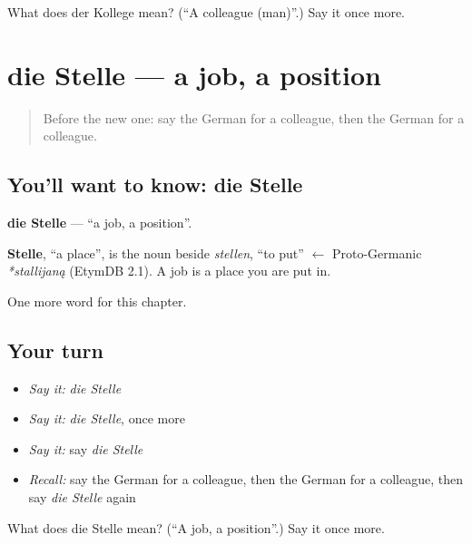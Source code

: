 \begin{tcolorbox}[breakable,colback=teal!4,colframe=teal!35!black,title={Before you move on}]
What does der Kollege mean? (\textquotedblleft{}A colleague (man)\textquotedblright{}.) Say it once more.
\end{tcolorbox}
\section[die Stelle]{die Stelle — a job, a position}

\label{lesson:GE-C154-stelle}



\begin{quote}
Before the new one: say the German for a colleague, then the German for a colleague.
\end{quote}

\subsection*{You'll want to know: die Stelle}
\textbf{die Stelle} — \textquotedblleft{}a job, a position\textquotedblright{}.

\begin{cousinweb}
\textbf{Stelle}, \textquotedblleft{}a place\textquotedblright{}, is the noun beside \emph{stellen}, \textquotedblleft{}to put\textquotedblright{} $\leftarrow$ Proto-Germanic \emph{*stallijaną} (EtymDB 2.1). A job is a place you are put in.
\end{cousinweb}

\begin{grammarlens}[title={What you've built}]
One more word for this chapter.
\end{grammarlens}

\subsection*{Your turn}
\begin{itemize}
\raggedright
  \item \emph{Say it:} \emph{die Stelle}
  \item \emph{Say it:} \emph{die Stelle}, once more
  \item \emph{Say it:} say \emph{die Stelle}
  \item \emph{Recall:} say the German for a colleague, then the German for a colleague, then say \emph{die Stelle} again
\end{itemize}

\begin{tcolorbox}[breakable,colback=teal!4,colframe=teal!35!black,title={Before you move on}]
What does die Stelle mean? (\textquotedblleft{}A job, a position\textquotedblright{}.) Say it once more.
\end{tcolorbox}
